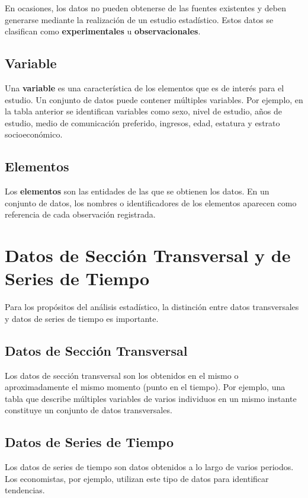 En ocasiones, los datos no pueden obtenerse de las fuentes existentes y deben generarse mediante la realización de un estudio estadístico. Estos datos se clasifican como \textbf{experimentales} u \textbf{observacionales}.

\subsection{Variable}

Una \textbf{variable} es una característica de los elementos que es de interés para el estudio. Un conjunto de datos puede contener múltiples variables. Por ejemplo, en la tabla anterior se identifican variables como sexo, nivel de estudio, años de estudio, medio de comunicación preferido, ingresos, edad, estatura y estrato socioeconómico.

\subsection{Elementos}

Los \textbf{elementos} son las entidades de las que se obtienen los datos. En un conjunto de datos, los nombres o identificadores de los elementos aparecen como referencia de cada observación registrada.

\section{Datos de Sección Transversal y de Series de Tiempo}

Para los propósitos del análisis estadístico, la distinción entre datos transversales y datos de series de tiempo es importante.

\subsection{Datos de Sección Transversal}

Los datos de sección transversal son los obtenidos en el mismo o aproximadamente el mismo momento (punto en el tiempo). Por ejemplo, una tabla que describe múltiples variables de varios individuos en un mismo instante constituye un conjunto de datos transversales.

\subsection{Datos de Series de Tiempo}

Los datos de series de tiempo son datos obtenidos a lo largo de varios periodos. Los economistas, por ejemplo, utilizan este tipo de datos para identificar tendencias.

